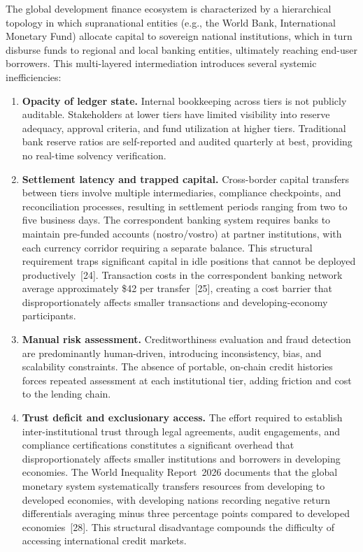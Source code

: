 \documentclass[12pt,a4paper]{report}
\begin{document}
The global development finance ecosystem is characterized by a hierarchical topology in which supranational entities (e.g., the World Bank, International Monetary Fund) allocate capital to sovereign national institutions, which in turn disburse funds to regional and local banking entities, ultimately reaching end-user borrowers. This multi-layered intermediation introduces several systemic inefficiencies:

\begin{enumerate}[noitemsep]
\item \textbf{Opacity of ledger state.} Internal bookkeeping across tiers is not publicly auditable. Stakeholders at lower tiers have limited visibility into reserve adequacy, approval criteria, and fund utilization at higher tiers. Traditional bank reserve ratios are self-reported and audited quarterly at best, providing no real-time solvency verification.

\item \textbf{Settlement latency and trapped capital.} Cross-border capital transfers between tiers involve multiple intermediaries, compliance checkpoints, and reconciliation processes, resulting in settlement periods ranging from two to five business days. The correspondent banking system requires banks to maintain pre-funded accounts (nostro/vostro) at partner institutions, with each currency corridor requiring a separate balance. This structural requirement traps significant capital in idle positions that cannot be deployed productively~[24]. Transaction costs in the correspondent banking network average approximately \$42 per transfer~[25], creating a cost barrier that disproportionately affects smaller transactions and developing-economy participants.

\item \textbf{Manual risk assessment.} Creditworthiness evaluation and fraud detection are predominantly human-driven, introducing inconsistency, bias, and scalability constraints. The absence of portable, on-chain credit histories forces repeated assessment at each institutional tier, adding friction and cost to the lending chain.

\item \textbf{Trust deficit and exclusionary access.} The effort required to establish inter-institutional trust through legal agreements, audit engagements, and compliance certifications constitutes a significant overhead that disproportionately affects smaller institutions and borrowers in developing economies. The World Inequality Report~2026 documents that the global monetary system systematically transfers resources from developing to developed economies, with developing nations recording negative return differentials averaging minus three percentage points compared to developed economies~[28]. This structural disadvantage compounds the difficulty of accessing international credit markets.
\end{enumerate}
\end{document}
